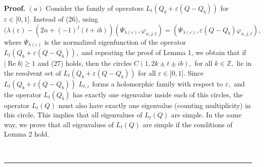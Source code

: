 \documentclass{article}%
\newenvironment{proof}[1][Proof]{\textbf{#1.} }{\ \rule{0.5em}{0.5em}}
\begin{document}
\begin{proof}
$(a)$ Consider the family of operators $L_{t}(Q_{b}+\varepsilon(Q-Q_{b}))$ for
$\varepsilon\in\lbrack0,1].$ Instead of (26), using
\[
(\lambda(\varepsilon)-(2n+\left(  -1\right)  ^{j}(t+ib))(\Psi_{\lambda
(\varepsilon)},\varphi_{n,j,t})=(\Psi_{\lambda(\varepsilon)},\varepsilon
(Q-Q_{b})\varphi_{n,j,t}),
\]
where $\Psi_{\lambda(\varepsilon)}$ is the normalized eigenfunction of the
operator $L_{t}(Q_{b}+\varepsilon(Q-Q_{b})),$ and repeating the proof of Lemma
1, we obtain that if $\left\vert \operatorname{Re}b\right\vert \geq1$ and (27)
holds, then the circles $C(1,2k\pm t\pm ib),$ for all $k\in\mathbb{Z},$ lie in
the resolvent set of $L_{t}(Q_{b}+\varepsilon(Q-Q_{b}))$ for all
$\varepsilon\in\lbrack0,1].$ Since $L_{t}(Q_{b}+\varepsilon(Q-Q_{b}))$
$L_{t,\varepsilon}$ forms a holomorphic family with respect to $\varepsilon,$
and the operator $L_{t}(Q_{b})$ has exactly one eigenvalue inside each of this
circles, the operator $L_{t}(Q)$ must also have exactly one eigenvalue
(counting multiplicity) in this circle. This implies that all eigenvalues of
$L_{t}(Q)$ are simple. In the same way, we prove that all eigenvalues of
$L_{t}(Q)$ are simple if the conditions of Lemma 2 hold.


\end{proof}
\end{document}
